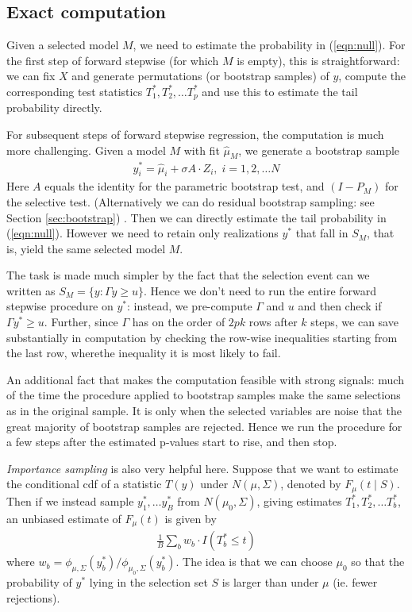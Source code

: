 \documentclass{article}
\begin{document}
\subsection{Exact computation}
\label{sec:exact}
Given a selected model $M$, we need to estimate the probability in (\ref{eqn:null}).
For the first step of forward stepwise (for which  $M$  is empty), this is straightforward:  we can fix $X$ and generate permutations (or bootstrap samples)
of $y$, compute the corresponding test statistics $T_1^*, T_2^*, \ldots T_p^*$  and use this to estimate the tail probability directly.

For subsequent steps of
forward stepwise regression, the computation is much more challenging. Given a model $M$ with fit $\hat\mu_M$,  we  generate a bootstrap sample
\begin{eqnarray}
y_i^*=\hat\mu_i+ \sigma A \cdot Z_i, \; i=1,2,\ldots N
\label{eq:boot}
\end{eqnarray}
Here $A$ equals the identity for the parametric bootstrap test, and $(I-P_M)$ for the selective test.
(Alternatively we can do residual bootstrap sampling: see Section \ref{sec:bootstrap}) .
 Then we can directly estimate the tail probability in  (\ref{eqn:null}). However we need to retain
only realizations $y^*$ that fall in $S_M$, that is, yield the same selected model $M$. 

The task is made much simpler by the fact that the selection event can we written as $S_M=\{y: \Gamma y \geq u\}$.
Hence we don't need to run the entire forward stepwise procedure on $y^*$: instead, we pre-compute $\Gamma$ and $u$ and then check
if $\Gamma y^* \geq u$. Further, since $\Gamma$ has on the  order of $2pk$ rows after $k$ steps,  we can save 
substantially in computation by checking the row-wise inequalities starting from the last row, wherethe inequality  it is most likely to fail.

An additional fact that makes the computation feasible with strong signals:  much  of the time the procedure applied to bootstrap samples
make the same selections as in the original sample. It is only when the selected variables are  noise that the great majority of bootstrap samples
are rejected. Hence we run the procedure for a few steps after  the estimated p-values start to rise, and then stop.

 {\em Importance sampling} is also very helpful here.
Suppose that we want to estimate the conditional cdf  of a statistic $T(y)$ under $N(\mu, \Sigma)$, denoted by
$F_\mu(t \mid S)$.
Then if we instead sample $y_1^*, \ldots y_B^*$ from $N(\mu_0,\Sigma)$,  giving estimates $T_1^*, T_2^*, \ldots T_b^*$, 
an unbiased estimate of $F_\mu(t)$ is given by
\begin{eqnarray}
\frac{1}{B} \sum_b w_b \cdot I(T_b^* \leq t)
\end{eqnarray}
where $w_b=\phi_{\mu,\Sigma}(y_b^*)/\phi_{\mu_0,\Sigma}(y_b^*)$.
The idea is that we can choose $\mu_0$ so that the probability of $y^*$  lying  in the selection set $S$ is larger than under
$\mu$ (ie. fewer rejections). 
\end{document}
